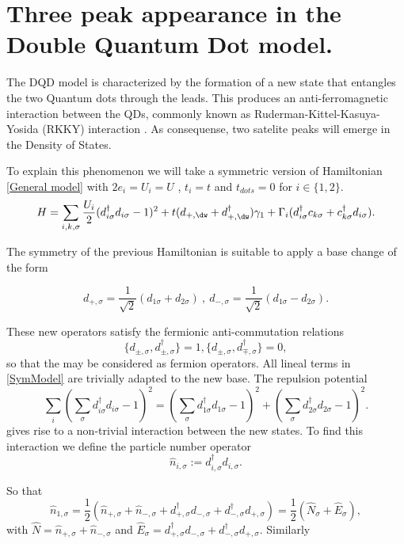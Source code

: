 \chapter{Three peak appearance in the Double Quantum Dot model.\label{chap:DoublePeak.}}

The DQD model is characterized by the formation of 
a new state that entangles the two Quantum dots through the leads. This produces an anti-ferromagnetic interaction between the QDs, commonly known
as Ruderman-Kittel-Kasuya-Yosida (RKKY) interaction \citep{ruderman_indirect_1954,yosida_magnetic_1957}. As consequense, two satelite peaks will emerge in the Density of States.  




To explain this phenomenon we will take a symmetric version of Hamiltonian \eqref{General model} with $2e_i =U_i =U $ , $t_i = t$ and $t_{dots} = 0$ for $i \in \{ 1,2 \}$. 
\begin{equation}
H =\sum_{i,k,\sigma}  \frac{U_i}{2}(d_{i \sigma}^{\dagger}d_{i \sigma}-1)^{2} + t(d_{+,\dw}+d^\dagger_{+,\dw})\gamma_1 + \Gamma_i(d^\dagger_{i\sigma}c_{k\sigma}+c^\dagger_{k\sigma}d_{i\sigma}).
\label{SymModel}
\end{equation}

The symmetry of the previous Hamiltonian is suitable to apply a base change of the form 
 
\[
  d_{+ , \sigma} = \frac{1}{\sqrt{2}} (d_{1\sigma} +d_{2\sigma}) \ , \ 
  d_{- , \sigma} = \frac{1}{\sqrt{2}} (d_{1\sigma} -d_{2\sigma}).
\]


These new operators satisfy the fermionic anti-commutation relations 
 \[ \{d_{\pm , \sigma}, d^\dagger_{\pm , \sigma}\} = 1 , \{ d_{\pm , \sigma}, d^\dagger_{\mp , \sigma}\} = 0,
\]
 so that the may be considered as fermion operators. All lineal terms in \eqref{SymModel} are trivially adapted to the new base. The repulsion potential 
$$\sum_{i} (\sum_{\sigma} d_{i \sigma}^{\dagger}d_{i \sigma}-1)^{2} = (\sum_{\sigma} d_{1 \sigma}^{\dagger}d_{1 \sigma}-1)^{2} + (\sum_{\sigma} d_{2 \sigma}^{\dagger}d_{2 \sigma}-1)^{2} . $$ 
gives rise to a non-trivial interaction between the new states. To find this interaction we define the particle number operator  
\[\hat{n}_{i,\sigma}:= d^\dagger_{i,\sigma}d_{i,\sigma}.\] 

So that 
\[\hat{n}_{1,\sigma}= \frac{1}{2} \left( \hat{n}_{+,\sigma} + \hat{n}_{-,\sigma} + d^\dagger_{+,\sigma}d_{-,\sigma} + d^\dagger_{-,\sigma}d_{+,\sigma} \right) = \frac{1}{2} \left( \hat{N}_\sigma + \hat{E}_\sigma \right),  \]
with $\hat{N} = \hat{n}_{+,\sigma} + \hat{n}_{-,\sigma}$ and $\hat{E}_\sigma = d^\dagger_{+,\sigma}d_{-,\sigma} + d^\dagger_{-,\sigma}d_{+,\sigma}. $ Similarly 

